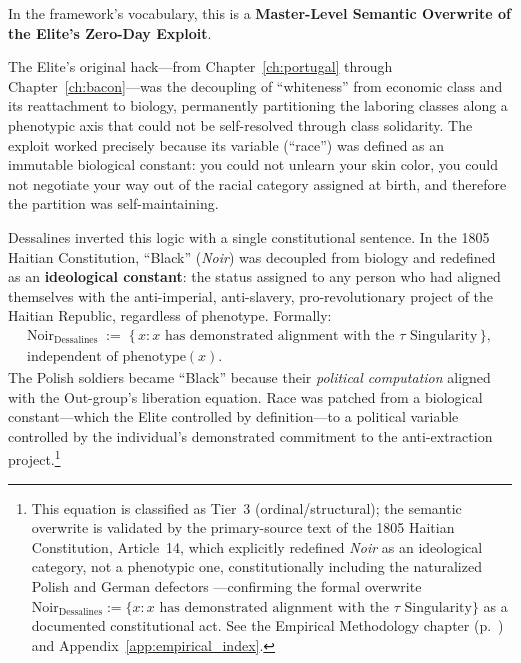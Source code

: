 In the framework's vocabulary, this is a \textbf{Master-Level Semantic Overwrite of the Elite's Zero-Day Exploit}.

The Elite's original hack---from Chapter~\ref{ch:portugal} through Chapter~\ref{ch:bacon}---was the decoupling of ``whiteness'' from economic class and its reattachment to biology, permanently partitioning the laboring classes along a phenotypic axis that could not be self-resolved through class solidarity. The exploit worked precisely because its variable (``race'') was defined as an immutable biological constant: you could not unlearn your skin color, you could not negotiate your way out of the racial category assigned at birth, and therefore the partition was self-maintaining.

Dessalines inverted this logic with a single constitutional sentence. In the 1805 Haitian Constitution, ``Black'' (\textit{Noir}) was decoupled from biology and redefined as an \textbf{ideological constant}: the status assigned to any person who had aligned themselves with the anti-imperial, anti-slavery, pro-revolutionary project of the Haitian Republic, regardless of phenotype. Formally:
\begin{equation}\label{eq:14.22-semantic-overwrite}
\begin{aligned}
\text{Noir}_{\text{Dessalines}} \;:=\; \bigl\{\,x : x \text{ has demonstrated alignment with the } \tau \text{ Singularity}\,\bigr\},\\
\text{independent of } \mathrm{phenotype}(x).
\end{aligned}
\end{equation}
The Polish soldiers became ``Black'' because their \textit{political computation} aligned with the Out-group's liberation equation. Race was patched from a biological constant---which the Elite controlled by definition---to a political variable controlled by the individual's demonstrated commitment to the anti-extraction project.\footnote{This equation is classified as Tier~3 (ordinal/structural); the semantic overwrite is validated by the primary-source text of the 1805 Haitian Constitution, Article~14, which explicitly redefined \textit{Noir} as an ideological category, not a phenotypic one, constitutionally including the naturalized Polish and German defectors \cite{haiti_constitution_1805}---confirming the formal overwrite $\text{Noir}_{\text{Dessalines}} := \{x : x \text{ has demonstrated alignment with the } \tau \text{ Singularity}\}$ as a documented constitutional act. See the Empirical Methodology chapter (p.~\pageref{ch:empirical_methodology}) and Appendix~\ref{app:empirical_index}.}

